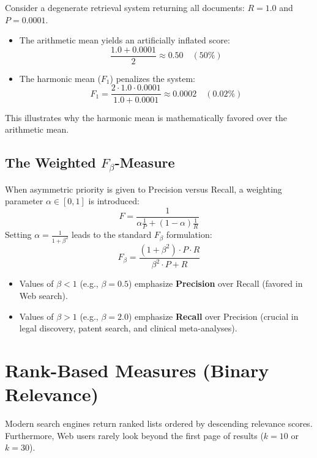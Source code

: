\begin{example}
Consider a degenerate retrieval system returning all documents: $R = 1.0$ and $P = 0.0001$.
\begin{itemize}
    \item The arithmetic mean yields an artificially inflated score:
    \[
    \frac{1.0 + 0.0001}{2} \approx 0.50 \quad (50\%)
    \]
    \item The harmonic mean ($F_1$) penalizes the system:
    \[
    F_1 = \frac{2 \cdot 1.0 \cdot 0.0001}{1.0 + 0.0001} \approx 0.0002 \quad (0.02\%)
    \]
\end{itemize}
This illustrates why the harmonic mean is mathematically favored over the arithmetic mean.
\end{example}

\subsection{\texorpdfstring{The Weighted $F_\beta$-Measure}{The Weighted F-beta Measure}}
When asymmetric priority is given to Precision versus Recall, a weighting parameter $\alpha \in [0, 1]$ is introduced:
\begin{equation}
F = \frac{1}{\alpha \frac{1}{P} + (1 - \alpha) \frac{1}{R}}
\end{equation}
Setting $\alpha = \frac{1}{1 + \beta^2}$ leads to the standard \textbf{$F_\beta$} formulation:
\begin{equation}
F_\beta = \frac{(1 + \beta^2) \cdot P \cdot R}{\beta^2 \cdot P + R}
\end{equation}
\begin{itemize}
    \item Values of $\beta < 1$ (e.g., $\beta = 0.5$) emphasize \textbf{Precision} over Recall (favored in Web search).
    \item Values of $\beta > 1$ (e.g., $\beta = 2.0$) emphasize \textbf{Recall} over Precision (crucial in legal discovery, patent search, and clinical meta-analyses).
\end{itemize}

\FloatBarrier
\section{Rank-Based Measures (Binary Relevance)}

Modern search engines return ranked lists ordered by descending relevance scores. Furthermore, Web users rarely look beyond the first page of results ($k = 10$ or $k = 30$).

